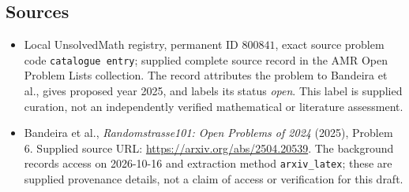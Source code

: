 \documentclass[11pt]{article}
\begin{document}
\subsection{Sources}
\begin{itemize}
\item Local UnsolvedMath registry, permanent ID \(800841\), exact source problem code \texttt{catalogue entry}; supplied complete source record in the AMR Open Problem Lists collection. The record attributes the problem to Bandeira et al., gives proposed year 2025, and labels its status \emph{open}. This label is supplied curation, not an independently verified mathematical or literature assessment.
\item Bandeira et al., \emph{Randomstrasse101: Open Problems of 2024} (2025), Problem 6. Supplied source URL: \url{https://arxiv.org/abs/2504.20539}. The background records access on 2026-10-16 and extraction method \texttt{arxiv\_latex}; these are supplied provenance details, not a claim of access or verification for this draft.
\end{itemize}
\end{document}

